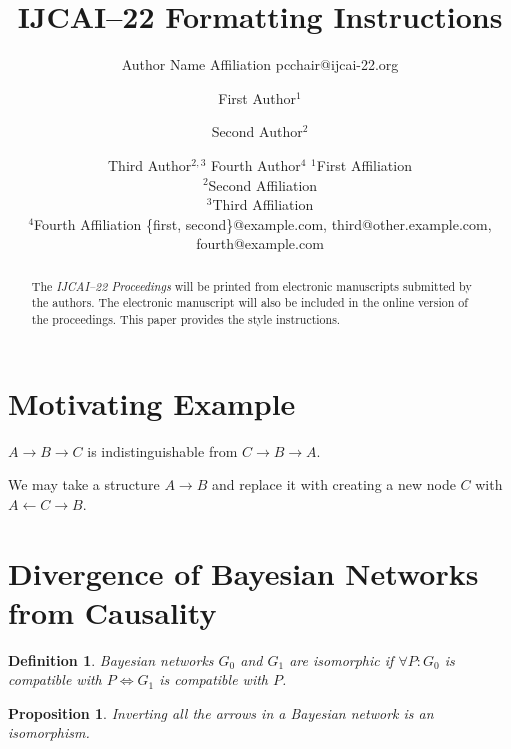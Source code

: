 \documentclass{article}
\title{IJCAI--22 Formatting Instructions}
\author{
	Author Name
	\affiliations
	Affiliation
	\emails
	pcchair@ijcai-22.org
}
\author{
	First Author$^1$
	\and
	Second Author$^2$\and
	Third Author$^{2,3}$\And
	Fourth Author$^4$
	\affiliations
	$^1$First Affiliation\\
	$^2$Second Affiliation\\
	$^3$Third Affiliation\\
	$^4$Fourth Affiliation
	\emails
	\{first, second\}@example.com,
	third@other.example.com,
	fourth@example.com
}
\newtheorem{definition}{Definition}
\newtheorem{proposition}{Proposition}
\begin{document}
	
	\maketitle
	
	\begin{abstract}
		The {\it IJCAI--22 Proceedings} will be printed from electronic
		manuscripts submitted by the authors. The electronic manuscript will
		also be included in the online version of the proceedings. This paper
		provides the style instructions.
	\end{abstract}
	
		
	\section{Motivating Example}
	$A \rightarrow B \rightarrow C$ is indistinguishable from $C \rightarrow B \rightarrow A$.
	
	We may take a structure $A \rightarrow B$ and replace it with creating a new node $C$ with $A \leftarrow C \rightarrow B$.
	
	\section{Divergence of Bayesian Networks from Causality}
	
	\begin{definition}
		Bayesian networks $G_0$ and $G_1$ are isomorphic if $\forall P: G_0$ is compatible with $P \iff G_1$ is compatible with $P$.
	\end{definition}

	\begin{proposition}
		Inverting all the arrows in a Bayesian network is an isomorphism.
	\end{proposition}
	
	
	\appendix
	
\end{document}
